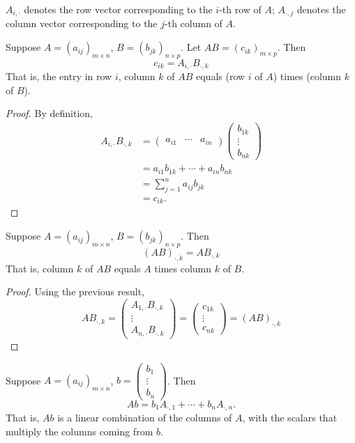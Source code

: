 \begin{notation}
$A_{i,\cdot}$ denotes the row vector corresponding to the $i$-th row of $A$; $A_{\cdot,j}$ denotes the column vector corresponding to the $j$-th column of $A$.
\end{notation}

\begin{proposition}
Suppose $A=(a_{ij})_{m\times n}$, $B=(b_{jk})_{n\times p}$. Let $AB=(c_{ik})_{m\times p}$. Then
\[c_{ik}=A_{i,\cdot}B_{\cdot,k}\]
That is, the entry in row $i$, column $k$ of $AB$ equals (row $i$ of $A$) times (column $k$ of $B$).
\end{proposition}

\begin{proof}
By definition,
\begin{align*}
A_{i,\cdot}B_{\cdot,k}
&=\begin{pmatrix}
a_{i1}&\cdots&a_{in}
\end{pmatrix}
\begin{pmatrix}
b_{1k}\\\vdots\\b_{nk}
\end{pmatrix}\\
&=a_{i1}b_{1k}+\cdots+a_{in}b_{nk}\\
&=\sum_{j=1}^{n}a_{ij}b_{jk}\\
&=c_{ik}.
\end{align*}
\end{proof}

\begin{proposition}
Suppose $A=(a_{ij})_{m\times n}$, $B=(b_{jk})_{n\times p}$. Then
\[(AB)_{\cdot,k}=AB_{\cdot,k}\]
That is, column $k$ of $AB$ equals $A$ times column $k$ of $B$.
\end{proposition}

\begin{proof}
Using the previous result,
\[AB_{\cdot,k}=\begin{pmatrix}
A_{1,\cdot}B_{\cdot,k}\\
\vdots\\
A_{n,\cdot}B_{\cdot,k}
\end{pmatrix}=\begin{pmatrix}
c_{1k}\\\vdots\\c_{nk}
\end{pmatrix}=(AB)_{\cdot,k}\]
\end{proof}

\begin{proposition}
Suppose $A=(a_{ij})_{m\times n}$, $b=\begin{pmatrix}
b_1\\\vdots\\b_n
\end{pmatrix}$. Then
\[Ab=b_1A_{\cdot,1}+\cdots+b_nA_{\cdot,n}.\]
That is, $Ab$ is a linear combination of the columns of $A$, with the scalars that multiply the columns coming from $b$.
\end{proposition}

